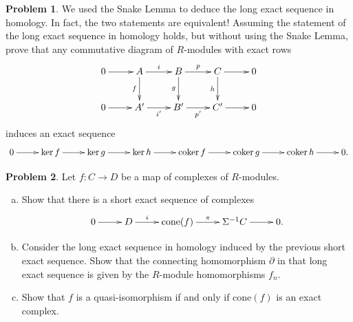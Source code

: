 \documentclass[11pt]{article}
\DeclareMathOperator{\coker}{coker}
\theoremstyle{definition}
\newtheorem{problem}{Problem}
\begin{document}
\vfill


\begin{problem}
	We used the Snake Lemma to deduce the long exact sequence in homology. In fact, the two statements are equivalent! Assuming the statement of the long exact sequence in homology holds, but without using the Snake Lemma, prove that any commutative diagram of $R$-modules with exact rows
	$$\xymatrix{0 \ar[r] & A \ar[d]_-f
	\ar[r]^-i & B \ar[r]^-p \ar[d]_-g & C \ar[r] \ar[d]_-h & 0 \\ 0 \ar[r] & A'
	\ar[r]_-{i'} & B' \ar[r]_-{p'} & C' \ar[r] & 0}$$
	induces an exact sequence
	$$\xymatrix{0 \ar[r] & \ker f \ar[r] & \ker g \ar[r] & \ker h \ar[r] & \coker f \ar[r] & \coker g \ar[r] & \coker h \ar[r] & 0.}$$
\end{problem}


\vfill

\noindent
{} 

\begin{problem} 
Let $f\!: C \longrightarrow D$ be a map of complexes of $R$-modules.
	\begin{enumerate}[a)]
		\item Show that there is a short exact sequence of complexes
		$$\xymatrix{0 \ar[r] & D \ar[r]^-i & \textrm{cone}(f) \ar[r]^-{\pi} & \Sigma^{-1} C \ar[r] & 0.}$$
		\item Consider the long exact sequence in homology induced by the previous short exact sequence. Show that the connecting homomorphism $\partial$ in that long exact sequence is given by the $R$-module homomorphisms $f_n$.
		\item Show that $f$ is a quasi-isomorphism if and only if $\textrm{cone}(f)$ is an exact complex.
	\end{enumerate}
\end{problem}
\end{document}
